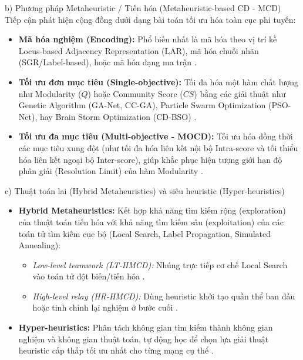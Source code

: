 \documentclass[14pt,a4paper]{extarticle}
\begin{document}
\noindent b) Phương pháp Metaheuristic / Tiến hóa (Metaheuristic-based CD - MCD) \\ \indent
Tiếp cận phát hiện cộng đồng dưới dạng bài toán tối ưu hóa toàn cục phi tuyến:
\begin{itemize}
    \item \textbf{Mã hóa nghiệm (Encoding):} Phổ biến nhất là mã hóa theo vị trí kề Locus-based Adjacency Representation (LAR), mã hóa chuỗi nhãn (SGR/Label-based), hoặc mã hóa dạng ma trận \cite{Baraa2021}.
    \item \textbf{Tối ưu đơn mục tiêu (Single-objective):} Tối đa hóa một hàm chất lượng như Modularity ($Q$) hoặc Community Score ($CS$) bằng các giải thuật như Genetic Algorithm (GA-Net, CC-GA), Particle Swarm Optimization (PSO-Net), hay Brain Storm Optimization (CD-BSO) \cite{Beldi2025}.
    \item \textbf{Tối ưu đa mục tiêu (Multi-objective - MOCD):} Tối ưu hóa đồng thời các mục tiêu xung đột (như tối đa hóa liên kết nội bộ Intra-score và tối thiểu hóa liên kết ngoại bộ Inter-score), giúp khắc phục hiện tượng giới hạn độ phân giải (Resolution Limit) của hàm Modularity \cite{Baraa2021}.
\end{itemize}

\noindent c) Thuật toán lai (Hybrid Metaheuristics) và siêu heuristic (Hyper-heuristics) \indent

\begin{itemize}
    \item \textbf{Hybrid Metaheuristics:} Kết hợp khả năng tìm kiếm rộng (exploration) của thuật toán tiến hóa với khả năng tìm kiếm sâu (exploitation) của các toán tử tìm kiếm cục bộ (Local Search, Label Propagation, Simulated Annealing):
    \begin{itemize}
        \item \textit{Low-level teamwork (LT-HMCD):} Nhúng trực tiếp cơ chế Local Search vào toán tử đột biến/tiến hóa \cite{Baraa2021}.
        \item \textit{High-level relay (HR-HMCD):} Dùng heuristic khởi tạo quần thể ban đầu hoặc tinh chỉnh lại nghiệm ở bước cuối \cite{Baraa2021}.
    \end{itemize}
    
    \item \textbf{Hyper-heuristics:} Phân tách không gian tìm kiếm thành không gian nghiệm và không gian thuật toán, tự động học để chọn lựa giải thuật heuristic cấp thấp tối ưu nhất cho từng mạng cụ thể \cite{Baraa2021}.
\end{itemize}
\end{document}

